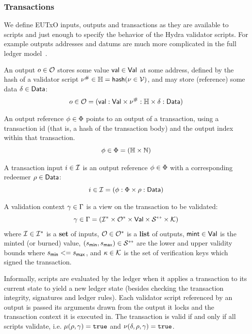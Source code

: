 \subsubsection{Transactions}

We define EUTxO inputs, outputs and transactions as they are available to
scripts and just enough to specify the behavior of the Hydra validator scripts.
For example outputs addresses and datums are much more complicated in the full
ledger model~\cite{eutxo-2, ledger-shelley-spec}.

\begin{definition}[Outputs]
	An output $o \in \mathcal{O}$ stores some value $\mathsf{val} \in \mathsf{Val}$ at some address,
	defined by the hash of a validator script $\nu^{\#} \in \mathbb{H} = \mathsf{hash}(\nu \in \mathcal{V})$,
	and may store (reference) some data $\delta \in \mathsf{Data}$:
	\[
		o \in \mathcal{O} = (\mathsf{val} : \mathsf{Val} \times \nu^{\#} : \mathbb{H} \times \delta : \mathsf{Data})
	\]
\end{definition}

\begin{definition}
	An output reference $\phi \in \Phi$ points to an output of a
	transaction, using a transaction id (that is, a hash of the transaction body)
	and the output index within that transaction.
	\[
		\phi \in \Phi = (\mathbb{H} \times \mathbb{N})
	\]
\end{definition}

\begin{definition}[Inputs]
	A transaction input $i \in \mathcal{I}$ is an output reference
	$\phi \in \Phi$ with a corresponding redeemer $\rho \in \mathsf{Data}$:
	\[
		i \in \mathcal{I} = (\phi : \Phi \times \rho : \mathsf{Data})
	\]
\end{definition}

\begin{definition}
	A validation context $\gamma \in \Gamma$ is a view on the transaction
	to be validated:
	\[
		\gamma \in \Gamma = (\mathcal{I}^* \times \mathcal{O}^* \times \mathsf{Val} \times \mathcal{S}^{\leftrightarrow} \times \mathcal{K})
	\]
	where $\mathcal{I} \in \mathcal{I}^*$ is a \textbf{set} of inputs,
	$\mathcal{O} \in \mathcal{O}^*$ is a \textbf{list} of outputs,
	$\mathsf{mint} \in \mathsf{Val}$ is the minted (or burned) value,
	$(s_{\mathsf{min}}, s_{\mathsf{max}}) \in \mathcal{S}^{\leftrightarrow}$
	 are
	the lower and upper validity bounds where $s_{\mathsf{min}} <= s_{\mathsf{max}}$, and $\kappa \in \mathcal{K}$ is the set
	of verification keys which signed the transaction.
\end{definition}

Informally, scripts are evaluated by the ledger when it applies a transaction to
its current state to yield a new ledger state (besides checking the transaction
integrity, signatures and ledger rules). Each validator script referenced by
an output is passed its arguments drawn from the output it locks and the
transaction context it is executed in. The transaction is valid if and only if
all scripts validate, i.e. $\mu(\rho, \gamma) = \mathtt{true}$ and
$\nu(\delta, \rho, \gamma) = \mathtt{true}$.

